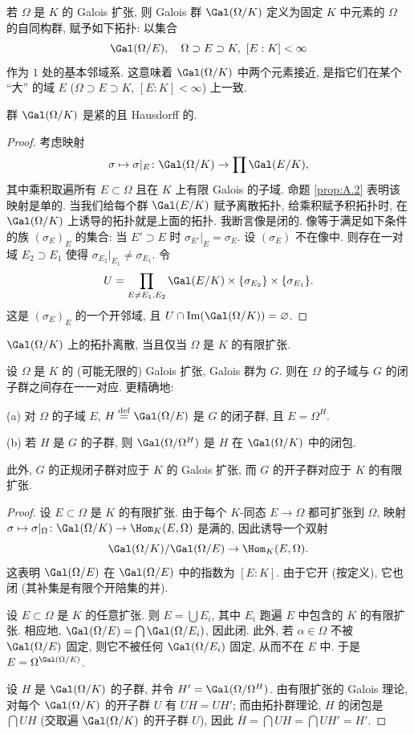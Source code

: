 若 $\Omega$ 是 $K$ 的 Galois 扩张, 则 Galois 群 $\Gal(\Omega/K)$ 定义为固定 $K$ 中元素的 $\Omega$ 的自同构群, 赋予如下拓扑: 以集合
\[
\Gal(\Omega/E),\quad \Omega\supset E\supset K,\ [E:K]<\infty
\]
作为 $1$ 处的基本邻域系. 这意味着 $\Gal(\Omega/K)$ 中两个元素接近, 是指它们在某个 “大” 的域 $E$ ($\Omega\supset E\supset K$, $[E:K]<\infty$) 上一致.

\begin{proposition}\label{prop:A.3}
群 $\Gal(\Omega/K)$ 是紧的且 Hausdorff 的.
\end{proposition}

\begin{proof}
考虑映射
\[
\sigma\mapsto\sigma|_E\colon\Gal(\Omega/K)\to\prod\Gal(E/K),
\]
其中乘积取遍所有 $E\subset\Omega$ 且在 $K$ 上有限 Galois 的子域. 命题 \ref{prop:A.2} 表明该映射是单的. 当我们给每个群 $\Gal(E/K)$ 赋予离散拓扑, 给乘积赋予积拓扑时, 在 $\Gal(\Omega/K)$ 上诱导的拓扑就是上面的拓扑. 我断言像是闭的. 像等于满足如下条件的族 $(\sigma_E)_E$ 的集合: 当 $E'\supset E$ 时 $\sigma_{E'}|_E=\sigma_E$. 设 $(\sigma_E)$ 不在像中. 则存在一对域 $E_2\supset E_1$ 使得 $\sigma_{E_2}|_{E_1}\neq\sigma_{E_1}$. 令
\[
U=\prod_{E\neq E_1,E_2}\Gal(E/K)\times\{\sigma_{E_2}\}\times\{\sigma_{E_1}\}.
\]
这是 $(\sigma_E)_E$ 的一个开邻域, 且 $U\cap\mathrm{Im}(\Gal(\Omega/K))=\varnothing$.
\end{proof}

$\Gal(\Omega/K)$ 上的拓扑离散, 当且仅当 $\Omega$ 是 $K$ 的有限扩张.

\begin{theorem}\label{thm:A.4}
设 $\Omega$ 是 $K$ 的 (可能无限的) Galois 扩张, Galois 群为 $G$. 则在 $\Omega$ 的子域与 $G$ 的闭子群之间存在一一对应. 更精确地:

(a) 对 $\Omega$ 的子域 $E$, $H\stackrel{\mathrm{def}}{=}\Gal(\Omega/E)$ 是 $G$ 的闭子群, 且 $E=\Omega^H$.

(b) 若 $H$ 是 $G$ 的子群, 则 $\Gal(\Omega/\Omega^H)$ 是 $H$ 在 $\Gal(\Omega/K)$ 中的闭包.

此外, $G$ 的正规闭子群对应于 $K$ 的 Galois 扩张, 而 $G$ 的开子群对应于 $K$ 的有限扩张.
\end{theorem}

\begin{proof}
设 $E\subset\Omega$ 是 $K$ 的有限扩张. 由于每个 $K$-同态 $E\to\Omega$ 都可扩张到 $\Omega$, 映射 $\sigma\mapsto\sigma|_{\Omega}\colon\Gal(\Omega/K)\to\Hom_K(E,\Omega)$ 是满的, 因此诱导一个双射
\[
\Gal(\Omega/K)/\Gal(\Omega/E)\to\Hom_K(E,\Omega).
\]
这表明 $\Gal(\Omega/E)$ 在 $\Gal(\Omega/E)$ 中的指数为 $[E:K]$. 由于它开 (按定义), 它也闭 (其补集是有限个开陪集的并).

设 $E\subset\Omega$ 是 $K$ 的任意扩张. 则 $E=\bigcup E_i$, 其中 $E_i$ 跑遍 $E$ 中包含的 $K$ 的有限扩张. 相应地, $\Gal(\Omega/E)=\bigcap\Gal(\Omega/E_i)$, 因此闭. 此外, 若 $\alpha\in\Omega$ 不被 $\Gal(\Omega/E)$ 固定, 则它不被任何 $\Gal(\Omega/E_i)$ 固定, 从而不在 $E$ 中. 于是 $E=\Omega^{\Gal(\Omega/E)}$.

设 $H$ 是 $\Gal(\Omega/K)$ 的子群, 并令 $H'=\Gal(\Omega/\Omega^H)$. 由有限扩张的 Galois 理论, 对每个 $\Gal(\Omega/K)$ 的开子群 $U$ 有 $UH=UH'$; 而由拓扑群理论, $H$ 的闭包是 $\bigcap UH$ (交取遍 $\Gal(\Omega/K)$ 的开子群 $U$), 因此 $\bar{H}=\bigcap UH=\bigcap UH'=H'$.
\end{proof}

